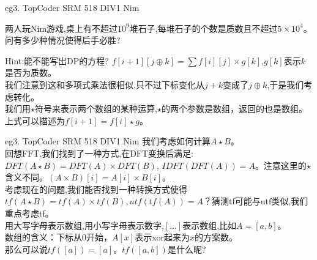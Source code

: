 \documentclass[allowframebreaks,10pt]{beamer}
\begin{document}
\begin{frame}{eg3. TopCoder SRM 518 DIV1 Nim}
\begin{example}
两人玩Nim游戏,桌上有不超过$10^9$堆石子,每堆石子的个数是质数且不超过$5 \times 10^4$。问有多少种情况使得后手必胜?
\end{example}
\pause
Hint:能不能写出DP的方程? \newline
\pause
$f[i+1][j\oplus k]=\sum f[i][j] \times g[k]$,$g[k]$表示$k$是否为质数。\\
\pause
我们注意到这和多项式乘法很相似,只不过下标变化从$j+k$变成了$j\oplus k$,于是我们考虑转化。 \\
\pause
我们用$\star$符号来表示两个数组的某种运算,$\star$的两个参数是数组，返回的也是数组。上式可以描述为$f[i+1]=f[i]\star g$。
\end{frame}
\begin{frame}{eg3. TopCoder SRM 518 DIV1 Nim}
我们考虑如何计算$A\star B$。\\
回想FFT,我们找到了一种方式,在DFT变换后满足:$DFT(A \star B)=DFT(A)\times DFT(B)$,
$IDFT(DFT(A))=A$。注意这里的$\star$含义不同。$(A\times B)[i]=A[i] \times B[i]$。\\
\pause
考虑现在的问题,我们能否找到一种转换方式使得$tf(A\star B)=tf(A) \times tf(B), utf(tf(A))=A$？猜测tf可能与utf类似,我们重点考虑tf。\\
\pause
用大写字母表示数组,用小写字母表示数字,$[\ldots]$表示数组,比如$A=[a,b]$。\\
数组的含义：下标从0开始，$A[x]$表示xor起来为$x$的方案数。\\
\pause
那么可以说$tf([a])=[a]$。$tf([a,b])$是什么呢?\\
\end{frame}
\end{document}
